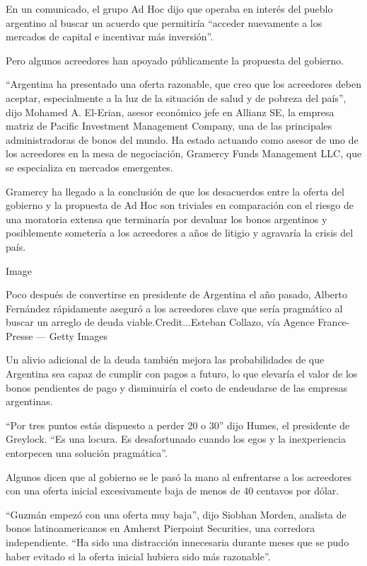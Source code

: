 En un comunicado, el grupo Ad Hoc dijo que operaba en interés del pueblo
argentino al buscar un acuerdo que permitiría ``acceder nuevamente a los
mercados de capital e incentivar más inversión''.

Pero algunos acreedores han apoyado públicamente la propuesta del
gobierno.

``Argentina ha presentado una oferta razonable, que creo que los
acreedores deben aceptar, especialmente a la luz de la situación de
salud y de pobreza del país'', dijo Mohamed A. El-Erian, asesor
económico jefe en Allianz SE, la empresa matriz de Pacific Investment
Management Company, una de las principales administradoras de bonos del
mundo. Ha estado actuando como asesor de uno de los acreedores en la
mesa de negociación, Gramercy Funds Management LLC, que se especializa
en mercados emergentes.

Gramercy ha llegado a la conclusión de que los desacuerdos entre la
oferta del gobierno y la propuesta de Ad Hoc son triviales en
comparación con el riesgo de una moratoria extensa que terminaría por
devaluar los bonos argentinos y posiblemente sometería a los acreedores
a años de litigio y agravaría la crisis del país.

Image

Poco después de convertirse en presidente de Argentina el año pasado,
Alberto Fernández rápidamente aseguró a los acreedores clave que sería
pragmático al buscar un arreglo de deuda viable.Credit...Esteban
Collazo, vía Agence France-Presse --- Getty Images

Un alivio adicional de la deuda también mejora las probabilidades de que
Argentina sea capaz de cumplir con pagos a futuro, lo que elevaría el
valor de los bonos pendientes de pago y disminuiría el costo de
endeudarse de las empresas argentinas.

``Por tres puntos estás dispuesto a perder 20 o 30'' dijo Humes, el
presidente de Greylock. ``Es una locura. Es desafortunado cuando los
egos y la inexperiencia entorpecen una solución pragmática''.

Algunos dicen que al gobierno se le pasó la mano al enfrentarse a los
acreedores con una oferta inicial excesivamente baja de menos de 40
centavos por dólar.

``Guzmán empezó con una oferta muy baja'', dijo Siobhan Morden, analista
de bonos latinoamericanos en Amherst Pierpoint Securities, una corredora
independiente. ``Ha sido una distracción innecesaria durante meses que
se pudo haber evitado si la oferta inicial hubiera sido más razonable''.

